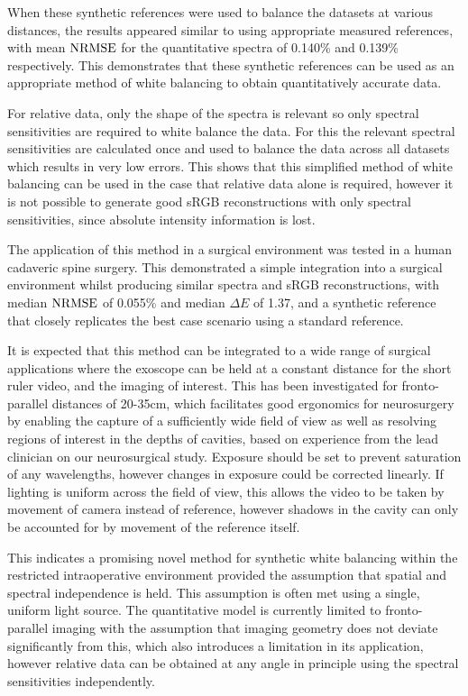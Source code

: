 When these synthetic references were used to balance the datasets at various distances, the results appeared similar to using appropriate measured references, with mean $\operatorname{NRMSE}$ for the quantitative spectra of 0.140\% and 0.139\% respectively. This demonstrates that these synthetic references can be used as an appropriate method of white balancing to obtain quantitatively accurate data. 

For relative data, only the shape of the spectra is relevant so only spectral sensitivities are required to white balance the data. For this the relevant spectral sensitivities are calculated once and used to balance the data across all datasets which results in very low errors. This shows that this simplified method of white balancing can be used in the case that relative data alone is required, however it is not possible to generate good sRGB reconstructions with only spectral sensitivities, since absolute intensity information is lost. 

The application of this method in a surgical environment was tested in a human cadaveric spine surgery. This demonstrated a simple integration into a surgical environment whilst producing similar spectra and sRGB reconstructions, with median $\operatorname{NRMSE}$ of 0.055\% and median $\Delta E$ of 1.37, and a synthetic reference that closely replicates the best case scenario using a standard reference. 

It is expected that this method can be integrated to a wide range of surgical applications where the exoscope can be held at a constant distance for the short ruler video, and the imaging of interest. This has been investigated for fronto-parallel distances of 20-35cm, which facilitates good ergonomics for neurosurgery by enabling the capture of a sufficiently wide field of view as well as resolving regions of interest in the depths of cavities, based on experience from the lead clinician on our neurosurgical study. Exposure should be set to prevent saturation of any wavelengths, however changes in exposure could be corrected linearly. If lighting is uniform across the field of view, this allows the video to be taken by movement of camera instead of reference, however shadows in the cavity can only be accounted for by movement of the reference itself.

This indicates a promising novel method for synthetic white balancing within the restricted intraoperative environment provided the assumption that spatial and spectral independence is held. This assumption is often met using a single, uniform light source. The quantitative model is currently limited to fronto-parallel imaging with the assumption that imaging geometry does not deviate significantly from this, which also introduces a limitation in its application, however relative data can be obtained at any angle in principle using the spectral sensitivities independently.

